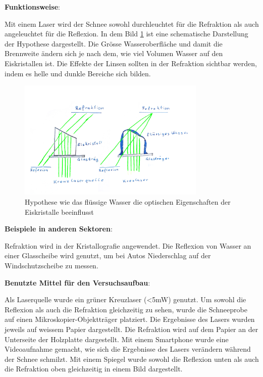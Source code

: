 

\textbf{Funktionsweise}:

Mit einem Laser wird der Schnee sowohl durchleuchtet für die Refraktion als auch angeleuchtet für die Reflexion. In dem Bild \ref{fig:LaserHypothese} ist eine schematische Darstellung der Hypothese dargestellt. Die Grösse Wasseroberfläche und damit die Brennweite ändern sich je nach dem, wie viel Volumen Wasser auf den Eiskristallen ist. Die Effekte der Linsen sollten in der Refraktion sichtbar werden, indem es helle und dunkle Bereiche sich bilden.


\begin{figure}
    \centering
    \includegraphics[width=0.8\textwidth]{Bilder/Reflaktion.jpeg}
    \caption{Hypothese wie das flüssige Wasser die optischen Eigenschaften der Eiskristalle beeinflusst}
    \label{fig:LaserHypothese}
\end{figure}

\textbf{Beispiele in anderen Sektoren}:

Refraktion wird in der Kristallografie angewendet. Die Reflexion von Wasser an einer Glasscheibe wird genutzt, um bei Autos Niederschlag auf der Windschutzscheibe zu messen.


\textbf{Benutzte Mittel für den Versuchsaufbau}:

Als Laserquelle wurde ein grüner Kreuzlaser (<5mW) genutzt. Um sowohl die Reflexion als auch die Refraktion gleichzeitig zu sehen, wurde die Schneeprobe auf einen Mikroskopier-Objektträger platziert. Die Ergebnisse des Lasers wurden jeweils auf weissem Papier dargestellt. Die Refraktion wird auf dem Papier an der Unterseite der Holzplatte dargestellt. Mit einem Smartphone wurde eine Videoaufnahme gemacht, wie sich die Ergebnisse des Lasers verändern während der Schnee schmilzt. Mit einem Spiegel wurde sowohl die Reflexion unten als auch die Refraktion oben gleichzeitig in einem Bild dargestellt.



